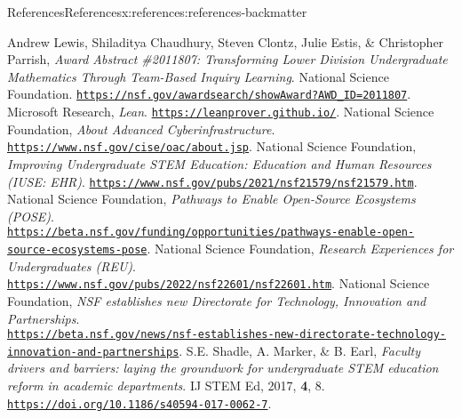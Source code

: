 \documentclass[oneside,10pt,]{article}
\begin{document}
\begin{references-section-numberless}{References}{}{References}{}{}{x:references:references-backmatter}
\begin{referencelist}
\hypertarget{x:biblio:biblio-tbil-award}{}Andrew Lewis, Shiladitya Chaudhury, Steven Clontz, Julie Estis, \& Christopher Parrish, \textit{Award Abstract \#2011807: Transforming Lower Division Undergraduate Mathematics Through Team-Based Inquiry Learning}. National Science Foundation. \href{https://nsf.gov/awardsearch/showAward?AWD_ID=2011807}{\nolinkurl{https://nsf.gov/awardsearch/showAward?AWD_ID=2011807}}.
\hypertarget{x:biblio:biblio-lean}{}Microsoft Research, \textit{Lean}. \href{https://leanprover.github.io/}{\nolinkurl{https://leanprover.github.io/}}.
\hypertarget{x:biblio:biblio-cyber-nsf}{}National Science Foundation, \textit{About Advanced Cyberinfrastructure}. \href{https://www.nsf.gov/cise/oac/about.jsp}{\nolinkurl{https://www.nsf.gov/cise/oac/about.jsp}}.
\hypertarget{x:biblio:biblio-iuse}{}National Science Foundation, \textit{Improving Undergraduate STEM Education: Education and Human Resources (IUSE: EHR)}. \href{https://www.nsf.gov/pubs/2021/nsf21579/nsf21579.htm}{\nolinkurl{https://www.nsf.gov/pubs/2021/nsf21579/nsf21579.htm}}.
\hypertarget{x:biblio:biblio-pose}{}National Science Foundation, \textit{Pathways to Enable Open-Source Ecosystems (POSE)}. \\\href{https://beta.nsf.gov/funding/opportunities/pathways-enable-open-source-ecosystems-pose}{\nolinkurl{https://beta.nsf.gov/funding/opportunities/pathways-enable-open-source-ecosystems-pose}}.
\hypertarget{x:biblio:biblio-reu}{}National Science Foundation, \textit{Research Experiences for Undergraduates (REU)}. \href{https://www.nsf.gov/pubs/2022/nsf22601/nsf22601.htm}{\nolinkurl{https://www.nsf.gov/pubs/2022/nsf22601/nsf22601.htm}}.
\hypertarget{x:biblio:biblio-tip-announce}{}National Science Foundation, \textit{NSF establishes new Directorate for Technology, Innovation and Partnerships}.\\ \href{https://beta.nsf.gov/news/nsf-establishes-new-directorate-technology-innovation-and-partnerships}{\nolinkurl{https://beta.nsf.gov/news/nsf-establishes-new-directorate-technology-innovation-and-partnerships}}.
\hypertarget{x:biblio:biblio-logistics}{}S.E. Shadle, A. Marker, \& B. Earl, \textit{Faculty drivers and barriers: laying the groundwork for undergraduate STEM education reform in academic departments}. IJ STEM Ed, 2017, \textbf{4}, 8. \href{https://doi.org/10.1186/s40594-017-0062-7}{\nolinkurl{https://doi.org/10.1186/s40594-017-0062-7}}.

\end{referencelist}
\end{references-section-numberless}
\end{document}
